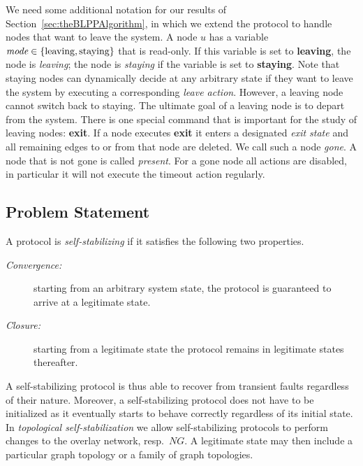\documentclass[a4paper,USenglish]{lipics}
\begin{document}
We need some additional notation for our results of Section~\ref{sec:theBLPPAlgorithm}, in which we extend the protocol to handle nodes that want to leave the system.
A node $u$ has a variable $\emph{mode} \in \{ \text{leaving}, \text{staying} \}$ that is read-only. 
If this variable is set to \textbf{leaving}, the node is \emph{leaving}; the node is \emph{staying} if the variable is set to \textbf{staying}.
Note that staying nodes can dynamically decide at any arbitrary state if they want to leave the system by executing a corresponding \emph{leave action}. 
However, a leaving node cannot switch back to staying.
The ultimate goal of a leaving node is to depart from the system.
There is one special command that is important for the study of leaving nodes: \textbf{exit}. 
If a node executes \textbf{exit} it enters a designated \emph{exit state} and all remaining edges to or from that node are deleted. 
We call such a node \emph{gone}. 
A node that is not gone is called \emph{present}.
For a gone node all actions are disabled, in particular it will not execute the timeout action regularly.

\subsection{Problem Statement}

A protocol is \emph{self-stabilizing} if it satisfies the following two properties.
\begin{description}
\item[\emph{Convergence:}] starting from an arbitrary system state, the protocol is guaranteed to arrive at a legitimate state.
\item[\emph{Closure:}] starting from a legitimate state the protocol remains in legitimate states thereafter.
\end{description}
A self-stabilizing protocol is thus able to recover from transient faults regardless of their nature. 
Moreover, a self-stabilizing protocol does not have to be initialized as it eventually starts to behave correctly regardless of its initial state. 
In \emph{topological self-stabilization} we allow self-stabilizing protocols to perform changes to the overlay network, resp.~$NG$. 
A legitimate state may then include a particular graph topology or a family of graph topologies.
\end{document}
